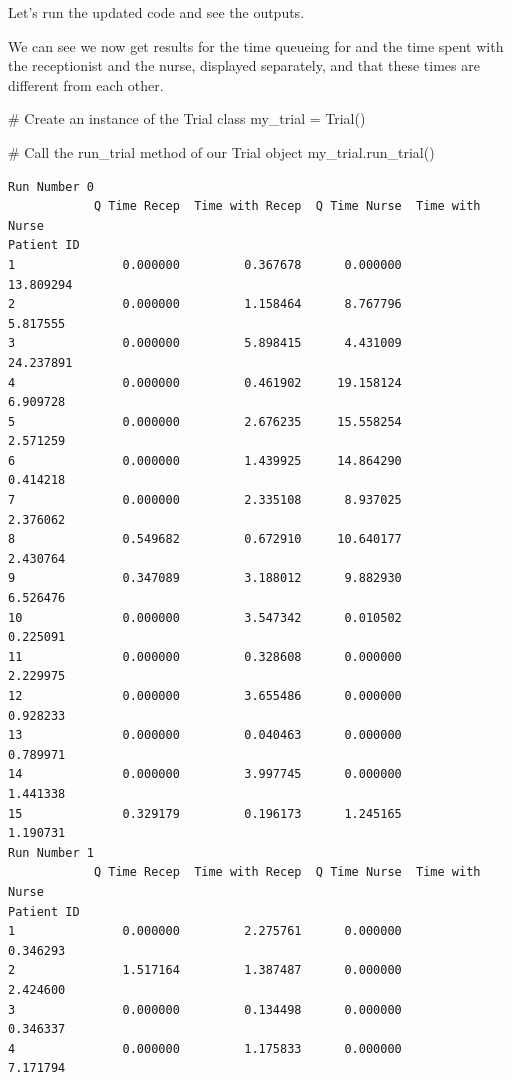 \documentclass[
  letterpaper,
  DIV=11,
  numbers=noendperiod]{scrreprt}
\newenvironment{Shaded}{}{}
\newcommand{\CommentTok}[1]{\textcolor[rgb]{0.42,0.45,0.49}{#1}}
\newcommand{\NormalTok}[1]{\textcolor[rgb]{0.14,0.16,0.18}{#1}}
\newcommand{\OperatorTok}[1]{\textcolor[rgb]{0.14,0.16,0.18}{#1}}
\begin{document}
Let's run the updated code and see the outputs.

We can see we now get results for the time queueing for and the time
spent with the receptionist and the nurse, displayed separately, and
that these times are different from each other.

\begin{Shaded}
\begin{Highlighting}[]
\CommentTok{\# Create an instance of the Trial class}
\NormalTok{my\_trial }\OperatorTok{=}\NormalTok{ Trial()}

\CommentTok{\# Call the run\_trial method of our Trial object}
\NormalTok{my\_trial.run\_trial()}
\end{Highlighting}
\end{Shaded}

\begin{verbatim}
Run Number 0
            Q Time Recep  Time with Recep  Q Time Nurse  Time with Nurse
Patient ID                                                              
1               0.000000         0.367678      0.000000        13.809294
2               0.000000         1.158464      8.767796         5.817555
3               0.000000         5.898415      4.431009        24.237891
4               0.000000         0.461902     19.158124         6.909728
5               0.000000         2.676235     15.558254         2.571259
6               0.000000         1.439925     14.864290         0.414218
7               0.000000         2.335108      8.937025         2.376062
8               0.549682         0.672910     10.640177         2.430764
9               0.347089         3.188012      9.882930         6.526476
10              0.000000         3.547342      0.010502         0.225091
11              0.000000         0.328608      0.000000         2.229975
12              0.000000         3.655486      0.000000         0.928233
13              0.000000         0.040463      0.000000         0.789971
14              0.000000         3.997745      0.000000         1.441338
15              0.329179         0.196173      1.245165         1.190731
Run Number 1
            Q Time Recep  Time with Recep  Q Time Nurse  Time with Nurse
Patient ID                                                              
1               0.000000         2.275761      0.000000         0.346293
2               1.517164         1.387487      0.000000         2.424600
3               0.000000         0.134498      0.000000         0.346337
4               0.000000         1.175833      0.000000         7.171794

\end{verbatim}
\end{document}
